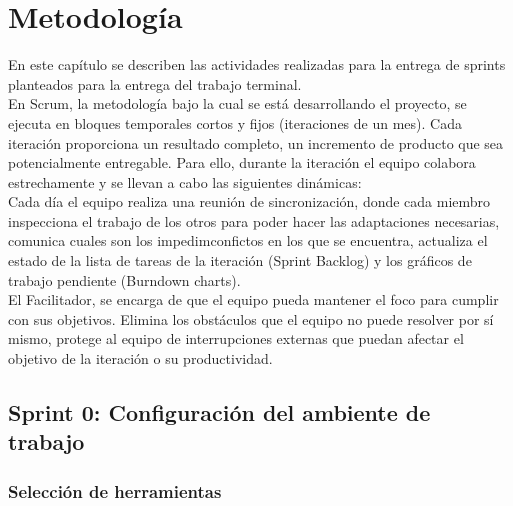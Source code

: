 \chapter{Metodología} \label{cap:siete}

En este capítulo se describen las actividades realizadas para la entrega de sprints planteados para la entrega del trabajo terminal.\\

En Scrum, la metodología bajo la cual se está desarrollando el proyecto, se ejecuta en bloques temporales cortos y fijos (iteraciones de un mes). Cada iteración proporciona un resultado completo, un incremento de producto que sea potencialmente entregable. Para ello, durante la iteración el equipo colabora estrechamente y se llevan a cabo las siguientes dinámicas:\\

Cada día el equipo realiza una reunión de sincronización, donde cada miembro inspecciona el trabajo de los otros para poder hacer las adaptaciones necesarias, comunica cuales son los impedimconfictos en los que se encuentra, actualiza el estado de la lista de tareas de la iteración (Sprint Backlog) y los gráficos de trabajo pendiente (Burndown charts).\\

El Facilitador, se encarga de que el equipo pueda mantener el foco para cumplir con sus objetivos.
Elimina los obstáculos que el equipo no puede resolver por sí mismo, protege al equipo de interrupciones externas que puedan afectar el objetivo de la iteración o su productividad.
\newpage

\section{Sprint 0: Configuración del ambiente de trabajo}
\subsection{Selección de herramientas}

